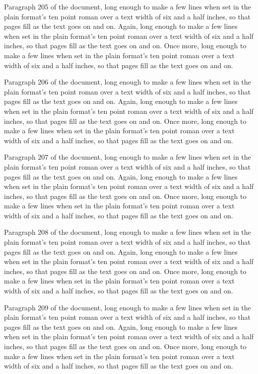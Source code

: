 Paragraph 205 of the document, long enough to make a few lines when set in the plain format's ten point roman over a text width of six and a half inches, so that pages fill as the text goes on and on. Again, long enough to make a few lines when set in the plain format's ten point roman over a text width of six and a half inches, so that pages fill as the text goes on and on. Once more, long enough to make a few lines when set in the plain format's ten point roman over a text width of six and a half inches, so that pages fill as the text goes on and on.

Paragraph 206 of the document, long enough to make a few lines when set in the plain format's ten point roman over a text width of six and a half inches, so that pages fill as the text goes on and on. Again, long enough to make a few lines when set in the plain format's ten point roman over a text width of six and a half inches, so that pages fill as the text goes on and on. Once more, long enough to make a few lines when set in the plain format's ten point roman over a text width of six and a half inches, so that pages fill as the text goes on and on.

Paragraph 207 of the document, long enough to make a few lines when set in the plain format's ten point roman over a text width of six and a half inches, so that pages fill as the text goes on and on. Again, long enough to make a few lines when set in the plain format's ten point roman over a text width of six and a half inches, so that pages fill as the text goes on and on. Once more, long enough to make a few lines when set in the plain format's ten point roman over a text width of six and a half inches, so that pages fill as the text goes on and on.

Paragraph 208 of the document, long enough to make a few lines when set in the plain format's ten point roman over a text width of six and a half inches, so that pages fill as the text goes on and on. Again, long enough to make a few lines when set in the plain format's ten point roman over a text width of six and a half inches, so that pages fill as the text goes on and on. Once more, long enough to make a few lines when set in the plain format's ten point roman over a text width of six and a half inches, so that pages fill as the text goes on and on.

Paragraph 209 of the document, long enough to make a few lines when set in the plain format's ten point roman over a text width of six and a half inches, so that pages fill as the text goes on and on. Again, long enough to make a few lines when set in the plain format's ten point roman over a text width of six and a half inches, so that pages fill as the text goes on and on. Once more, long enough to make a few lines when set in the plain format's ten point roman over a text width of six and a half inches, so that pages fill as the text goes on and on.

